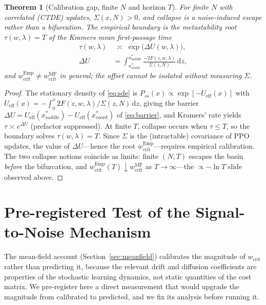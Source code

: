 \documentclass[letterpaper]{article}
\theoremstyle{plain}
\newtheorem{theorem}{Theorem}
\newcommand{\wcrit}{w_{\mathrm{crit}}}
\begin{document}
\begin{theorem}[Calibration gap, finite $N$ and horizon $T$]\label{thm:gap}
For finite $N$ with correlated (CTDE) updates, $\Sigma(x,N)>0$, and collapse is a
noise-induced escape rather than a bifurcation. The empirical boundary is the
metastability root $\tau(w,\lambda)=T$ of the Kramers mean first-passage time
\begin{equation}
\begin{aligned}
  \tau(w,\lambda)&\;\asymp\;\exp\!\big(\Delta U(w,\lambda)\big),\\
  \Delta U&=\int_{x^\ast_{\mathrm{coord}}}^{x^\ast_{\mathrm{saddle}}}
    \frac{-2F(z,w,\lambda)}{\Sigma(z,N)}\,\mathrm{d}z,
\end{aligned}
  \label{eq:barrier}
\end{equation}
and $w_{\mathrm{crit}}^{\mathrm{Emp}}\neq w_{\mathrm{crit}}^{\mathrm{MF}}$ in
general; the offset cannot be isolated without measuring $\Sigma$.
\end{theorem}
\begin{proof}
The stationary density of \eqref{eq:sde} is
$P_{ss}(x)\propto\exp[-U_{\mathrm{eff}}(x)]$ with
$U_{\mathrm{eff}}(x)=-\!\int_0^x 2F(z,w,\lambda)/\Sigma(z,N)\,\mathrm{d}z$, giving
the barrier $\Delta U=U_{\mathrm{eff}}(x^\ast_{\mathrm{saddle}})
-U_{\mathrm{eff}}(x^\ast_{\mathrm{coord}})$ of \eqref{eq:barrier}, and Kramers'
rate yields $\tau\asymp e^{\Delta U}$ (prefactor suppressed). At finite $T$,
collapse occurs when $\tau\le T$, so the boundary solves
$\tau(w,\lambda)=T$. Since $\Sigma$ is the (intractable) covariance of PPO
updates, the value of $\Delta U$---hence the root
$w_{\mathrm{crit}}^{\mathrm{Emp}}$---requires empirical calibration. The two
collapse notions coincide as limits:
finite $(N,T)$ escapes the basin \emph{before} the  bifurcation, and
$w_{\mathrm{crit}}^{\mathrm{Emp}}(T)\!\downarrow\!w_{\mathrm{crit}}^{\mathrm{MF}}$
as $T\to\infty$---the $\propto-\ln T$ slide observed above.
\end{proof}


\section{Pre-registered Test of the Signal-to-Noise Mechanism}
\label{sec:appendix_snr}

The mean-field account (Section~\ref{sec:meanfield}) calibrates the magnitude of
$\wcrit$ rather than predicting it, because the relevant drift and diffusion
coefficients are properties of the stochastic learning dynamics, not static
quantities of the cost matrix. We pre-register here a direct measurement that
would upgrade the magnitude from calibrated to predicted, and we fix its
analysis before running it.
\end{document}
